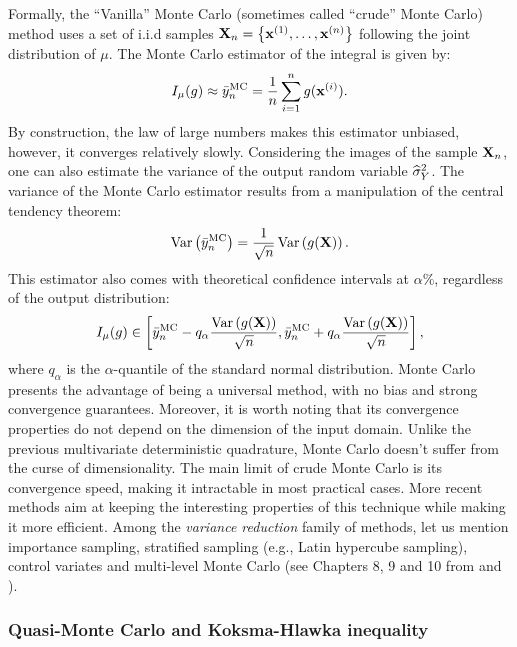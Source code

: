 Formally, the ``Vanilla'' Monte Carlo (sometimes called ``crude'' Monte Carlo) method uses a set of i.i.d samples ${\bf X}_n = \left\{{\bf x}^{(1)}, \dots, {\bf x}^{(n)}\right\}$ following the joint distribution of $\mu$. 
The Monte Carlo estimator of the integral is given by: 
\begin{equation}
    I_{\mu}(g) \approx \Bar{y}_n^{\textrm{MC}} = \frac1n \sum_{i=1}^{n} g({\bf x}^{(i)}).
\end{equation}
By construction, the law of large numbers makes this estimator unbiased, however, it converges relatively slowly. 
Considering the images of the sample ${\bf X}_n$, one can also estimate the variance of the output random variable $\widehat{\sigma}^2_Y$.
The variance of the Monte Carlo estimator results from a manipulation of the central tendency theorem:
\begin{equation}
    \operatorname{Var}\left(\Bar{y}_n^{\textrm{MC}}\right) = \frac{1}{\sqrt{n}} \operatorname{Var}\left(g({\bf X})\right). 
    \label{eq:MC_variance}
\end{equation}
This estimator also comes with theoretical confidence intervals at $\alpha \%$, regardless of the output distribution: 
\begin{equation}
    I_{\mu}(g) \in \left[\Bar{y}_n^{\textrm{MC}}  - q_\alpha \frac{\operatorname{Var}\left(g({\bf X})\right)}{\sqrt{n}}, \Bar{y}_n^{\textrm{MC}}  + q_\alpha \frac{\operatorname{Var}\left(g({\bf X})\right)}{\sqrt{n}} \right],
    \label{eq:MC_IC}
\end{equation}
where $q_\alpha$ is the $\alpha$-quantile of the standard normal distribution.
Monte Carlo presents the advantage of being a universal method, with no bias and strong convergence guarantees. 
Moreover, it is worth noting that its convergence properties do not depend on the dimension of the input domain. 
Unlike the previous multivariate deterministic quadrature, Monte Carlo doesn't suffer from the curse of dimensionality. 
The main limit of crude Monte Carlo is its convergence speed, making it intractable in most practical cases. 
More recent methods aim at keeping the interesting properties of this technique while making it more efficient.
Among the \textit{variance reduction} family of methods, let us mention importance sampling, stratified sampling (e.g., Latin hypercube sampling), control variates and multi-level Monte Carlo (see Chapters 8, 9 and 10 from \citet{owen_2013} and \citep{giles_2008}).


\subsubsection{Quasi-Monte Carlo and Koksma-Hlawka inequality}

